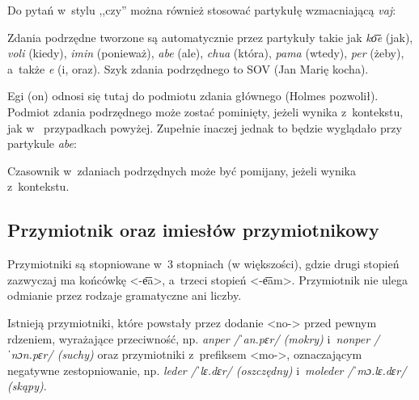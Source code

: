 \begin{spacing}{1.1}
Do pytań w~stylu ,,czy'' można również stosować partykułę wzmacniającą \emph{vaj}:


Zdania podrzędne tworzone są automatycznie przez partykuły takie jak \emph{ko͞e} 
(jak), \emph{voli} (kiedy), \emph{imin} (ponieważ), \emph{abe} (ale), 
\emph{chua} (która), \emph{pama} (wtedy), \emph{per} (żeby), a~także \emph{e} 
(i, oraz). Szyk zdania podrzędnego to SOV (Jan Marię kocha).



Egi (on) odnosi się tutaj do podmiotu zdania głównego (Holmes pozwolił). Podmiot 
zdania podrzędnego może zostać pominięty, jeżeli wynika z~kontekstu, jak w~
przypadkach powyżej. Zupełnie inaczej jednak to będzie wyglądało przy partykule 
\emph{abe}:


Czasownik w~zdaniach podrzędnych może być pomijany, jeżeli wynika z~kontekstu.


\subsection{Przymiotnik oraz imiesłów przymiotnikowy}

Przymiotniki są stopniowane w~3 stopniach (w większości), gdzie drugi stopień 
zazwyczaj ma końcówkę <-e͞a>, a~trzeci stopień <-e͞am>. Przymiotnik nie ulega 
odmianie przez rodzaje gramatyczne ani liczby.

Istnieją przymiotniki, które powstały przez dodanie <no-> przed pewnym rdzeniem,
wyrażające przeciwność, np. \emph{anper /ˈan.pɛr/ (mokry)} i~\emph{nonper 
/ˈnɔn.pɛr/ (suchy)} oraz przymiotniki z~prefiksem <mo->, oznaczającym negatywne 
zestopniowanie, np. \emph{leder /ˈlɛ.dɛr/ (oszczędny)} i~\emph{moleder 
/ˈmɔ.lɛ.dɛr/ (skąpy)}.


\end{spacing}
